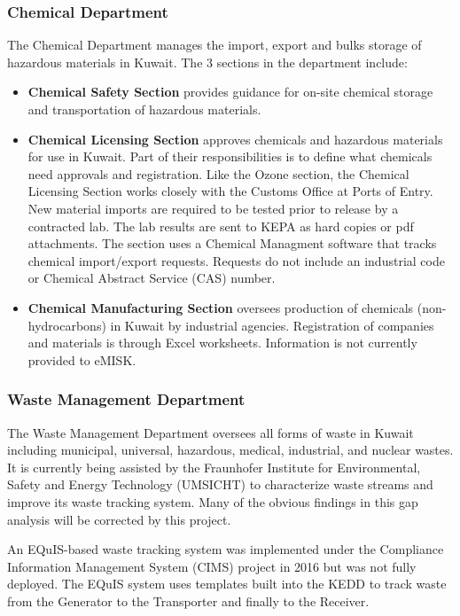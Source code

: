 \subsubsection{Chemical  Department}
The Chemical Department manages the import, export and bulks storage of hazardous materials in Kuwait. The 3 sections in the department include:

\begin{itemize}
\item \textbf{Chemical Safety Section} provides guidance for on-site chemical storage and transportation of hazardous materials.

\item \textbf{Chemical  Licensing Section} approves chemicals and hazardous materials for use in Kuwait. Part of their responsibilities is to define what chemicals need approvals and registration.  Like the Ozone section, the Chemical Licensing Section works closely with the Customs Office at Ports of Entry. New material imports are required to be tested prior to release by a contracted lab. The lab results are sent to KEPA as hard copies or pdf attachments. The section uses a Chemical Managment software that tracks chemical import/export requests. Requests do not include an industrial code or Chemical Abstract Service (CAS) number.

\item \textbf{Chemical  Manufacturing Section} oversees production of chemicals (non-hydrocarbons) in Kuwait by industrial agencies. Registration of companies and materials is through Excel worksheets. Information is not currently provided to eMISK.

\end{itemize}

\subsubsection{Waste Management Department}
The Waste Management Department oversees all forms of waste in Kuwait including municipal, universal, hazardous, medical, industrial, and nuclear wastes. It is currently being assisted by the  Fraunhofer Institute for Environmental, Safety and Energy Technology (UMSICHT) to characterize waste streams and improve its waste tracking system. Many of the obvious findings in this gap analysis will be corrected by this project.

An EQuIS-based waste tracking system was implemented under the Compliance Information Management System (CIMS) project in 2016 but was not fully deployed. The EQuIS system uses templates built into the KEDD to track waste from the Generator to the Transporter and finally to the Receiver.

